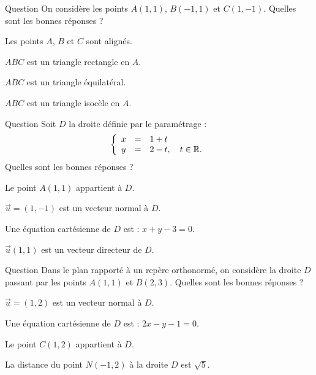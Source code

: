 \begin{multi}[multiple,feedback=
{On a \(\overrightarrow{AB}=(-2,0)\) et \(\overrightarrow{AC}=(0,-2)\). Les points \(A\), \(B\) et \(C\) ne sont pas alignés. De plus, \(\|\overrightarrow{AB}\|=2=\|\overrightarrow{AC}\|\) donc \(ABC\) est isocèle en \(A\) et \(\overrightarrow{AB}.\overrightarrow{AC}=0\), donc \(ABC\) est rectangle en \(A\).
}]{Question}
On considère les points \(A(1,1)\), \(B(-1,1)\) et \(C(1,-1)\). Quelles sont les bonnes réponses ?

    \item Les points \(A\), \(B\) et \(C\) sont alignés.
    \item* \(ABC\) est un triangle rectangle en \(A\).
    \item \(ABC\) est un triangle équilatéral.
    \item* \(ABC\) est un triangle isocèle en \(A\).
\end{multi}


\begin{multi}[multiple,feedback=
{Le vecteur \(\vec{u}=(1,-1)\) est un vecteur directeur de \(D\). On élimine \(t\) en additionnant les deux équations. Ceci donne \(x+y=3\) qui est une équation cartésienne de \(D\).
}]{Question}
Soit \(D\) la droite définie par le paramétrage :
\[\left\{\begin{array}{ccl}x&=&1+t\\ y&=&2-t,\quad t\in \mathbb{R}.
\end{array}\right.\]
Quelles sont les bonnes réponses ?

    \item Le point \(A(1,1)\) appartient à \(D\).
    \item \(\vec{u}=(1,-1)\) est un vecteur normal à \(D\).
    \item* Une équation cartésienne de \(D\) est : \(x+y-3=0\).
    \item \(\vec{u}(1,1)\) est un vecteur directeur de \(D\).
\end{multi}


\begin{multi}[multiple,feedback=
{Le vecteur \(\overrightarrow{AB}=(1,2)\) dirige \(D\) et \(M(x,y)\in D\Leftrightarrow \mbox{det} \left(\overrightarrow{AM},\overrightarrow{AB}\right)=0\), c'est-à-dire \(2x-y-1=0\). La distance de \(N\) à \(D\) est donnée par \(\displaystyle \frac{|2\times (-1)-2-1|}{\sqrt{2^2+1^2}}=\sqrt{5}\).
}]{Question}
Dans le plan rapporté à un repère orthonormé, on considère la droite \(D\) passant par les points \(A(1,1)\) et \(B(2,3)\). Quelles sont les bonnes réponses ?

    \item \(\vec{u}=(1,2)\) est un vecteur normal à \(D\).
    \item* Une équation cartésienne de \(D\) est : \(2x-y-1=0\).
    \item Le point \(C(1,2)\) appartient à \(D\).
    \item* La distance du point \(N(-1,2)\) à la droite \(D\) est \(\sqrt{5}\).
\end{multi}


